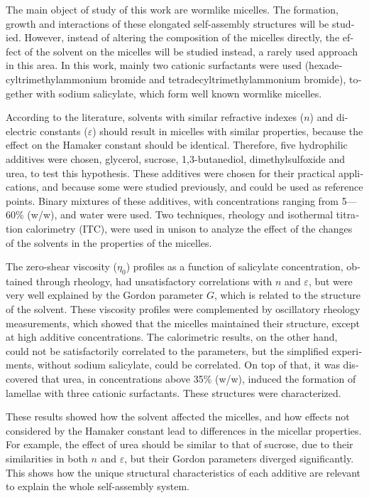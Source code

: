 \documentclass[
	12pt,				%
	openright,			%
	twoside,			%
	a4paper,			%
	english,			%
	brazil%
	]{abntex2}
\begin{document}
\begin{resumo}[Abstract]
 \begin{english}
 	The main object of study of this work are wormlike micelles. The formation, growth and interactions of these elongated self-assembly structures will be studied. However, instead of altering the composition of the micelles directly, the effect of the solvent on the micelles will be studied instead, a rarely used approach in this area. In this work, mainly two cationic surfactants were used (hexadecyltrimethylammonium bromide and tetradecyltrimethylammonium bromide), together with sodium salicylate, which form well known wormlike micelles.
 	
 	According to the literature, solvents with similar refractive indexes (\(n\)) and dielectric constants (\(\varepsilon\)) should result in micelles with similar properties, because the effect on the Hamaker constant should be identical. Therefore, five hydrophilic additives were chosen, glycerol, sucrose, 1,3-butanediol, dimethylsulfoxide and urea, to test this hypothesis. These additives were chosen for their practical applications, and because some were studied previously, and could be used as reference points. Binary mixtures of these additives, with concentrations ranging from 5---60\% (w/w), and water were used. Two techniques, rheology and isothermal titration calorimetry (ITC), were used in unison to analyze the effect of the changes of the solvents in the properties of the micelles.
 	
 	The zero-shear viscosity (\(\eta_0\)) profiles as a function of salicylate concentration, obtained through rheology, had unsatisfactory correlations with \(n\) and \(\varepsilon\), but were very well explained by the Gordon parameter \(G\), which is related to the structure of the solvent. These viscosity profiles were complemented by oscillatory rheology measurements, which showed that the micelles maintained their structure, except at high additive concentrations. The calorimetric results, on the other hand, could not be satisfactorily correlated to the parameters, but the simplified experiments, without sodium salicylate, could be correlated. On top of that, it was discovered that urea, in concentrations above 35\% (w/w), induced the formation of lamellae with three cationic surfactants. These structures were characterized.
 	
 	These results showed how the solvent affected the micelles, and how effects not considered by the Hamaker constant lead to differences in the micellar properties. For example, the effect of urea should be similar to that of sucrose, due to their similarities in both \(n\) and \(\varepsilon\), but their Gordon parameters diverged significantly. This shows how the unique structural characteristics of each additive are relevant to explain the whole self-assembly system.
 	

\end{english}
\end{resumo}
\end{document}
